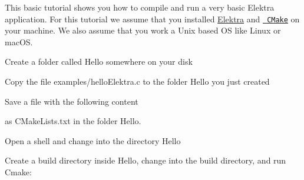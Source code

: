 \label{doc_tutorials_hello-elektra_md_md_doc_tutorials_hello_elektra}%
%
 This basic tutorial shows you how to compile and run a very basic Elektra application. For this tutorial we assume that you installed \mbox{\hyperlink{doc_INSTALL_md}{Elektra}} and \href{https://cmake.org}{\texttt{ CMake}} on your machine. We also assume that you work a Unix based OS like Linux or mac\+OS.


\begin{DoxyEnumerate}
\item Create a folder called {\ttfamily Hello} somewhere on your disk
\item Copy the file {\ttfamily examples/hello\+Elektra.\+c} to the folder {\ttfamily Hello} you just created
\item Save a file with the following content
\end{DoxyEnumerate}


\begin{DoxyCode}{0}
\DoxyCodeLine{}
\DoxyCodeLine{}
\DoxyCodeLine{}

\end{DoxyCode}


as {\ttfamily CMake\+Lists.\+txt} in the folder {\ttfamily Hello}.


\begin{DoxyEnumerate}
\item Open a shell and change into the directory {\ttfamily Hello}
\item Create a build directory inside {\ttfamily Hello}, change into the build directory, and run Cmake\+:
\end{DoxyEnumerate}


\begin{DoxyCode}{0}

\end{DoxyCode}


